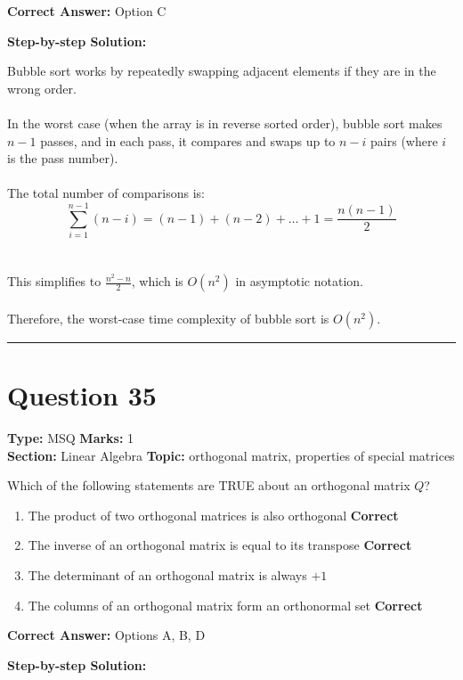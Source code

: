 \documentclass[11pt]{article}
\begin{document}
\textbf{Correct Answer:} Option C

\textbf{Step-by-step Solution:}

Bubble sort works by repeatedly swapping adjacent elements if they are in the wrong order.\\
\\
In the worst case (when the array is in reverse sorted order), bubble sort makes \(n-1\) passes, and in each pass, it compares and swaps up to \(n-i\) pairs (where \(i\) is the pass number).\\
\\
The total number of comparisons is:\\
\[\sum_{i=1}^{n-1} (n-i) = (n-1) + (n-2) + \dots + 1 = \frac{n(n-1)}{2}\]\\
\\
This simplifies to \(\frac{n^2 - n}{2}\), which is \(O(n^2)\) in asymptotic notation.\\
\\
Therefore, the worst-case time complexity of bubble sort is \(O(n^2)\).

\vspace{0.8em}
\hrule
\vspace{0.4em}
\section*{Question 35}
\textbf{Type:} MSQ \hfill \textbf{Marks:} 1\\
\textbf{Section:} Linear Algebra \hfill \textbf{Topic:} orthogonal matrix, properties of special matrices

Which of the following statements are TRUE about an orthogonal matrix \(Q\)?


\begin{enumerate}[label=\textbf{\Alph*.}, leftmargin=1.8em]
\item The product of two orthogonal matrices is also orthogonal \hfill {\color{gategreen}\textbf{Correct}}\item The inverse of an orthogonal matrix is equal to its transpose \hfill {\color{gategreen}\textbf{Correct}}\item The determinant of an orthogonal matrix is always \(+1\)\item The columns of an orthogonal matrix form an orthonormal set \hfill {\color{gategreen}\textbf{Correct}}\end{enumerate}

\textbf{Correct Answer:} Options A, B, D

\textbf{Step-by-step Solution:}
\end{document}
